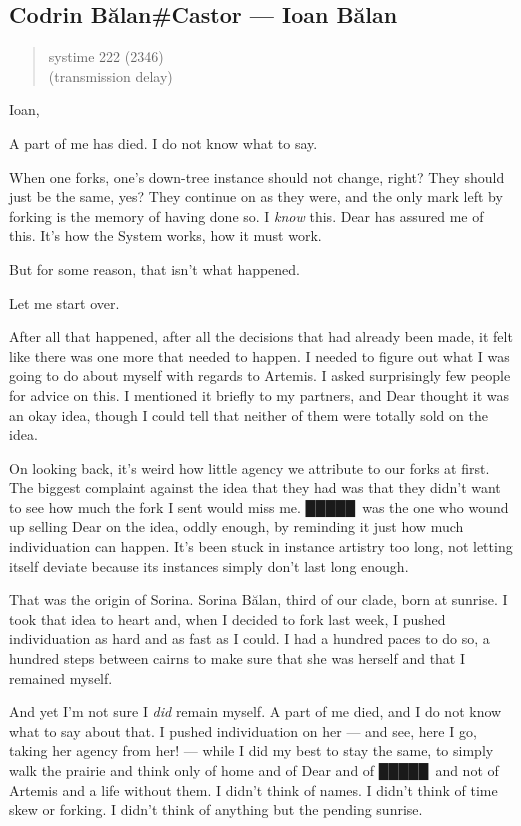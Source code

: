 \hypertarget{codrin-bux103lancastor-ioan-bux103lan}{%
\subsection{Codrin Bălan\#Castor — Ioan Bălan}\label{codrin-bux103lancastor-ioan-bux103lan}}

\begin{quote}
systime 222 (2346)\\
(transmission delay)
\end{quote}

Ioan,

A part of me has died. I do not know what to say.

When one forks, one's down-tree instance should not change, right? They should just be the same, yes? They continue on as they were, and the only mark left by forking is the memory of having done so. I \emph{know} this. Dear has assured me of this. It's how the System works, how it must work.

But for some reason, that isn't what happened.

Let me start over.

After all that happened, after all the decisions that had already been made, it felt like there was one more that needed to happen. I needed to figure out what I was going to do about myself with regards to Artemis. I asked surprisingly few people for advice on this. I mentioned it briefly to my partners, and Dear thought it was an okay idea, though I could tell that neither of them were totally sold on the idea.

On looking back, it's weird how little agency we attribute to our forks at first. The biggest complaint against the idea that they had was that they didn't want to see how much the fork I sent would miss me. █████\ was the one who wound up selling Dear on the idea, oddly enough, by reminding it just how much individuation can happen. It's been stuck in instance artistry too long, not letting itself deviate because its instances simply don't last long enough.

That was the origin of Sorina. Sorina Bălan, third of our clade, born at sunrise. I took that idea to heart and, when I decided to fork last week, I pushed individuation as hard and as fast as I could. I had a hundred paces to do so, a hundred steps between cairns to make sure that she was herself and that I remained myself.

And yet I'm not sure I \emph{did} remain myself. A part of me died, and I do not know what to say about that. I pushed individuation on her — and see, here I go, taking her agency from her! — while I did my best to stay the same, to simply walk the prairie and think only of home and of Dear and of █████\ and not of Artemis and a life without them. I didn't think of names. I didn't think of time skew or forking. I didn't think of anything but the pending sunrise.

